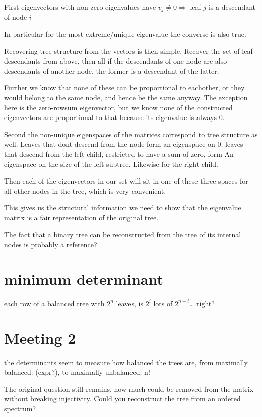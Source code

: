 \documentclass[10pt,a4paper]{report}
\begin{document}
First eigenvectors with non-zero eigenvalues have $v_{j} \neq 0 \Rightarrow$
leaf $j$ is a descendant of node $i$

In particular for the most extreme/unique eigenvalue the converse is also true.

Recovering tree structure from the vectors is then simple.
Recover the set of leaf descendants from above, then all if the descendants of
one node are also descendants of another node, the former is a descendant of
the latter.

Further we know that none of these can be proportional to eachother, or they
would belong to the same node, and hence be the same anyway.
The exception here is the zero-rowsum eigenvector, but we know none of the
constructed eigenvectors are proportional to that because its eigenvalue is
always 0.

Second the non-unique eigenspaces of the matrices correspond to tree structure
as well.
Leaves that dont descend from the node form an eigenspace on 0.
leaves that descend from the left child, restricted to have a sum of zero, form
An eigenspace on the size of the left subtree.
Likewise for the right child.

Then each of the eigenvectors in our set will sit in one of these three spaces
for all other nodes in the tree, which is very convenient.

This gives us the structural information we need to show that the eigenvalue
matrix is a fair representation of the original tree.

The fact that a binary tree can be reconstructed from the tree of its internal
nodes is probably a reference?

\section{minimum determinant}

each row of a balanced tree with $2^n$ leaves, is $2^i$ lots of $2^{n-i}$\ldots
right?

\section{Meeting 2}

the determinants seem to measure how balanced the trees are, from maximally
balanced: (expr?), to maximally unbalanced: n!

The original question still remains, how much could be removed from the matrix
without breaking injectivity. Could you reconstruct the tree from an ordered
spectrum?
\end{document}
